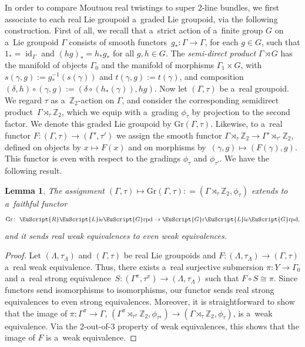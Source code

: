\documentclass[pdftex]{sigma}
\numberwithin{equation}{section}
\newtheorem{Lemma}[Theorem]{Lemma}
\def\mathscr#1{\EuScript{#1}}
\def\Z {\mathbb{Z}}
\def\liegrpd{\mathscr{L}\text{ie}\mathscr{G}\text{rpd}}
\newcommand{\id}{\operatorname{id}}
\def\Gr{\mathrm{Gr}}
\def\Rliegrpd{\normalfont\mathscr{R}\liegrpd}
\def\Grliegrpd{\normalfont\mathscr{G}\mathrm{r}\liegrpd}
\begin{document}
In order to compare Moutuou real twistings to super 2-line bundles, we first associate to each real Lie groupoid a~graded Lie groupoid, via the following construction. First of all, we recall that a~strict action of a~finite group $G$ on a~Lie groupoid $\Gamma$ consists of smooth functors~${g_* \colon \Gamma \to \Gamma}$, for each $g\in G$, such
 that $1_* = \id_{\Gamma}$ and $(hg)_* = h_* g_*$ for all $g,h \in G$. The \emph{semi-direct product} $\Gamma \rtimes G$ has the manifold of objects $\Gamma_0$ and the manifold of morphisms $\Gamma_1 \times G$, with~${s(\gamma,g) := g_{*}^{-1}(s(\gamma))}$ and $t(\gamma,g) := t(\gamma)$, and composition $(\delta,h) \circ (\gamma,g) := (\delta \circ (h_{*}(\gamma)), hg)$.
Now let $(\Gamma,\tau)$ be a~real groupoid. We regard $\tau$ as a~$\Z_2$-action on $\Gamma$, and consider the corresponding semidirect product~${\Gamma \rtimes_{\tau} \Z_2}$, which we equip with a~grading $\phi_{\tau}$ by projection to the second factor. We denote this graded Lie groupoid by $\Gr(\Gamma,\tau)$. Likewise, to a~real functor $F \colon (\Gamma,\tau) \to (\Gamma',\tau')$ we assign the smooth
functor $\Gamma \rtimes_{\tau} \Z_2 \to \Gamma' \rtimes_{\tau'} \Z_2$, defined on objects by $x \mapsto F(x)$ and on morphisms by~${(\gamma,g) \mapsto (F(\gamma),g)}$. This functor is even with respect to the gradings $\phi_{\tau}$ and $\phi_{\tau'}$.
We have the following result.
\begin{Lemma}
\label{lemma: Real Morita equivalences give rise to even weak equivalences between the associated semidirect product groupoids}
 The assignment $(\Gamma,\tau) \mapsto \Gr(\Gamma,\tau) : =(\Gamma \rtimes_{\tau} \Z_2,\phi_{\tau})$ extends to a~faithful functor
 \begin{equation*}
 \Gr\colon\ \Rliegrpd \to\Grliegrpd,
 \end{equation*}
 and it sends real weak equivalences to even weak equivalences.
\end{Lemma}

\begin{proof}
 Let $(\Lambda,\tau_{\Lambda})$ and $(\Gamma,\tau)$ be real Lie groupoids and $F \colon (\Lambda,\tau_{\Lambda}) \to (\Gamma,\tau)$ a~real weak equivalence.
 Thus, there exists a~real surjective
 submersion $\pi \colon Y \to \Gamma_0$ and a~real strong equivalence~${S \colon (\Gamma^\pi,\tau^\pi) \to (\Lambda,\tau_{\Lambda})}$ such that $F \circ S \cong \pi$.
Since functors send isomorphisms to isomorphisms, our functor sends real strong equivalences to even strong equivalences. Moreover, it is straightforward to show that the image of $\pi\colon \Gamma^{\pi} \to \Gamma$,
$
 (\Gamma^\pi \rtimes_{\tau^\pi} \Z_2,\phi_{\tau^{\pi}}) \to (\Gamma \rtimes_{\tau} \Z_2,\phi_{\tau})$,
 is a~weak equivalence. Via the 2-out-of-3 property of weak equivalences, this shows that the image of $F$ is a~weak equivalence.
\end{proof}
\end{document}
